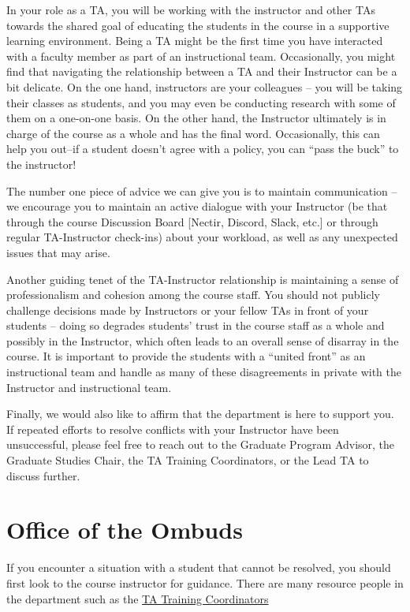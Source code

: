 \documentclass[
  letterpaper,
  DIV=11,
  numbers=noendperiod]{scrreprt}
\begin{document}
In your role as a TA, you will be working with the instructor and other
TAs towards the shared goal of educating the students in the course in a
supportive learning environment. Being a TA might be the first time you
have interacted with a faculty member as part of an instructional team.
Occasionally, you might find that navigating the relationship between a
TA and their Instructor can be a bit delicate. On the one hand,
instructors are your colleagues -- you will be taking their classes as
students, and you may even be conducting research with some of them on a
one-on-one basis. On the other hand, the Instructor ultimately is in
charge of the course as a whole and has the final word. Occasionally,
this can help you out--if a student doesn't agree with a policy, you can
``pass the buck'' to the instructor!

The number one piece of advice we can give you is to maintain
communication -- we encourage you to maintain an active dialogue with
your Instructor (be that through the course Discussion Board {[}Nectir,
Discord, Slack, etc.{]} or through regular TA-Instructor check-ins)
about your workload, as well as any unexpected issues that may arise.

Another guiding tenet of the TA-Instructor relationship is maintaining a
sense of professionalism and cohesion among the course staff. You should
not publicly challenge decisions made by Instructors or your fellow TAs
in front of your students -- doing so degrades students' trust in the
course staff as a whole and possibly in the Instructor, which often
leads to an overall sense of disarray in the course. It is important to
provide the students with a ``united front'' as an instructional team
and handle as many of these disagreements in private with the Instructor
and instructional team.

Finally, we would also like to affirm that the department is here to
support you. If repeated efforts to resolve conflicts with your
Instructor have been unsuccessful, please feel free to reach out to the
Graduate Program Advisor, the Graduate Studies Chair, the TA Training
Coordinators, or the Lead TA to discuss further.

\hypertarget{office-of-the-ombuds}{%
\chapter{Office of the Ombuds}\label{office-of-the-ombuds}}

If you encounter a situation with a student that cannot be resolved, you
should first look to the course instructor for guidance. There are many
resource people in the department such as the
\protect\hyperlink{AcadLead}{TA Training Coordinators}
\end{document}
